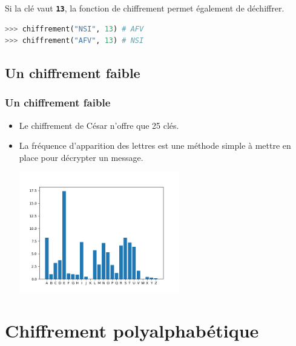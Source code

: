 \documentclass[svgnames,11pt]{beamer}
\begin{document}
\begin{frame}[fragile]
    \frametitle{}

    \begin{aretenir}[Remarque]
        Si la clé vaut \textbf{\texttt{13}}, la fonction de chiffrement permet également de déchiffrer.
        \end{aretenir}
\begin{center}
\begin{lstlisting}[language=Python , basicstyle=\ttfamily\small, xleftmargin=0.2em, xrightmargin=0em]
>>> chiffrement("NSI", 13) # AFV
>>> chiffrement("AFV", 13) # NSI
\end{lstlisting}
\end{center}

\end{frame}
\subsection{Un chiffrement faible}
\begin{frame}
    \frametitle{Un chiffrement faible}

    \begin{itemize}
        \item<1-> Le chiffrement de César n'offre que 25 clés.
        \item<2->La fréquence d'apparition des lettres est une méthode simple à mettre en place pour décrypter un message.
        \begin{center}
        \centering
        \includegraphics[width=7cm]{ressources/frequence-apparition.png}
        \label{IMG}
        \end{center}
    \end{itemize}

\end{frame}
\section{Chiffrement polyalphabétique}
\end{document}
